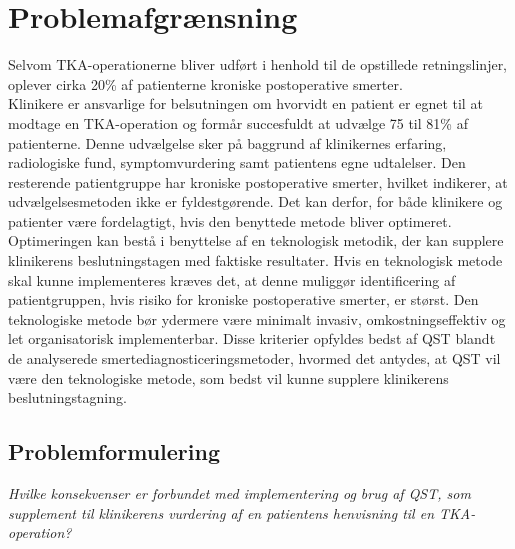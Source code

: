 \newpage \section{Problemafgrænsning}
Selvom TKA-operationerne bliver udført i henhold til de opstillede retningslinjer, oplever cirka 20\% af patienterne kroniske postoperative smerter.\\
Klinikere er ansvarlige for belsutningen om hvorvidt en patient er egnet til at modtage en TKA-operation og formår succesfuldt at udvælge 75 til 81\% af patienterne. Denne udvælgelse sker på baggrund af klinikernes erfaring, radiologiske fund, symptomvurdering samt patientens egne udtalelser. Den resterende patientgruppe har kroniske postoperative smerter, hvilket indikerer, at udvælgelsesmetoden ikke er fyldestgørende. Det kan derfor, for både klinikere og patienter være fordelagtigt, hvis den benyttede metode bliver optimeret. Optimeringen kan bestå i benyttelse af en teknologisk metodik, der kan supplere klinikerens beslutningstagen med faktiske resultater. Hvis en teknologisk metode skal kunne implementeres kræves det, at denne muliggør identificering af patientgruppen, hvis risiko for kroniske postoperative smerter, er størst. Den teknologiske metode bør ydermere være minimalt invasiv, omkostningseffektiv og let organisatorisk implementerbar. Disse kriterier opfyldes bedst af QST blandt de analyserede smertediagnosticeringsmetoder, hvormed det antydes, at QST vil være den teknologiske metode, som bedst vil kunne supplere klinikerens beslutningstagning. 

\subsection{Problemformulering}
\begin{center}
	\textit{Hvilke konsekvenser er forbundet med implementering og brug af QST, som supplement til
		klinikerens vurdering af en patientens henvisning til en TKA-operation?}
\end{center}